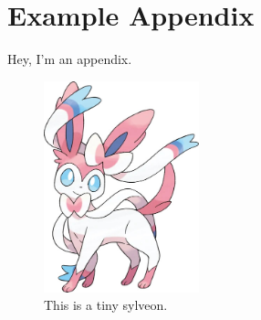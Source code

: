 \section{Example Appendix}

Hey, I'm an appendix.

\begin{figure}
    \centering
    \includegraphics[width=0.4\textwidth]{resources/images/sylveon.jpg}
    \caption{This is a tiny sylveon.}
    \label{fig:sylvappendix}
\end{figure}